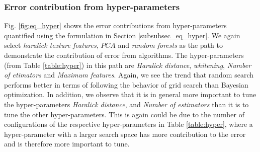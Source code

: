\subsubsection{Error contribution from hyper-parameters}

Fig. \ref{fig:eq_hyper} shows the error contributions from hyper-parameters quantified using the formulation in Section \ref{subsubsec_eq_hyper}. We again select \textit{haralick texture features}, $PCA$ and \textit{random forests} as the path to demonstrate the contribution of error from algorithms. The hyper-parameters (from Table \ref{table:hyper}) in this path are \textit{Haralick distance}, \textit{whitening}, \textit{Number of etimators} and \textit{Maximum features}. Again, we see the trend that random search performs better in terms of following the behavior of grid search than Bayesian optimization. In addition, we observe that it is in general more important to tune the hyper-parameters \textit{Haralick distance}, and \textit{Number of estimators} than it is to tune  the other hyper-parameters. This is again could be due to the number of configurations of the respective hyper-parameters in Table \ref{table:hyper}, where a hyper-parameter with a larger search space has more contribution to the error and is therefore more important to tune.

